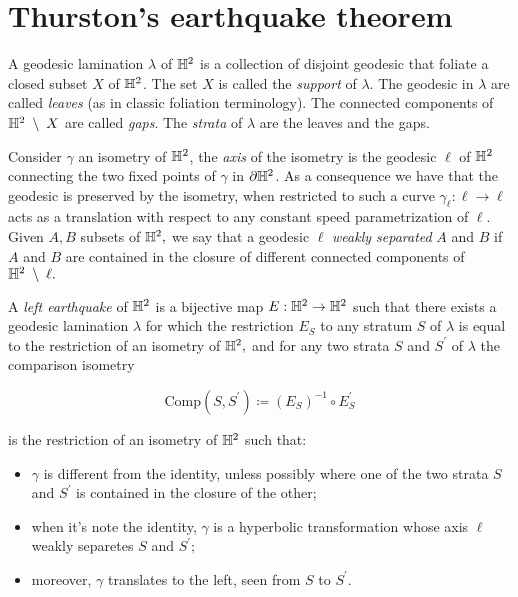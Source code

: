 \chapter{Thurston's earthquake theorem}

\begin{definition}
    A geodesic lamination $\lambda$ of $\mathbb{H}^2$ is a collection of disjoint geodesic that foliate a closed subset $X$ of $\mathbb{H}^2$. The set $X$ is called the \textit{support} of $\lambda.$ The geodesic in $\lambda$ are called \textit{leaves} (as in classic foliation terminology). The connected components of $\mathbb{H}^2\;\setminus\;X$ are called \textit{gaps}. The \textit{strata} of $\lambda$ are the leaves and the gaps.
\end{definition}

Consider $\gamma$ an isometry of $\mathbb{H}^2$, the \textit{axis} of the isometry is the geodesic $\ell$ of $\mathbb{H}^2$ connecting the two fixed points of $\gamma$ in $\partial\mathbb{H}^2$. As a consequence we have that the geodesic is preserved by the isometry, when restricted to such a curve $\gamma_\ell:\ell\to\ell$ acts as a translation with respect to any constant speed parametrization of $\ell$.\\
Given $A,B$ subsets of $\mathbb{H}^2,$ we say that a geodesic $\ell$ \textit{weakly separated} $A$ and $B$ if $A$ and $B$ are contained in the closure of different connected components of $\mathbb{H}^2\;\setminus\;\ell.$ 

\begin{definition}
    A \textit{left earthquake} of $\mathbb{H}^2$ is a bijective map $E:\mathbb{H}^2\to\mathbb{H}^2$ such that there exists a geodesic lamination $\lambda$ for which the restriction $E_S$ to any stratum $S$ of $\lambda$ is equal to the restriction of an isometry of $\mathbb{H}^2,$ and for any two strata $S$ and $S^{\prime}$ of $\lambda$ the comparison isometry 
    
    \[
        \text{Comp}(S,S^{\prime})\coloneqq (E_S)^{-1}\circ E_S^{\prime}
    \]

    is the restriction of an isometry of $\mathbb{H}^2$ such that:
    \begin{itemize}
        \item $\gamma$ is different from the identity, unless possibly where one of the two strata $S$ and $S^{\prime}$ is contained in the closure of the other;
        \item when it's note the identity, $\gamma$ is a hyperbolic transformation whose axis $\ell$ weakly separetes $S$ and $S^{\prime};$
        \item moreover, $\gamma$ translates to the left, seen from $S$ to $S^{\prime}$. 
    \end{itemize}
\end{definition}

